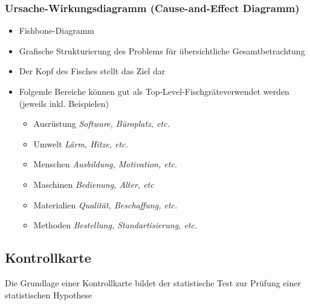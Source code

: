 \subsubsection{Ursache-Wirkungsdiagramm (Cause-and-Effect Diagramm)}
\label{subsubsec:UrsacheWirkungsDiagramm}
\begin{itemize}
	\item \glqq Fishbone-Diagramm\grqq 
	\item Grafische Strukturierung des Problems für übersichtliche Gesamtbetrachtung
	\item Der Kopf des Fisches stellt das Ziel dar
	\item Folgende Bereiche können gut als \glqq Top-Level-Fischgräte\grqq verwendet werden (jeweils inkl. Beispielen)
	\begin{itemize}
		\item Ausrüstung \textit{Software, Büroplatz, etc.}
		\item Umwelt \textit{Lärm, Hitze, etc.}
		\item Menschen \textit{Ausbildung, Motivation, etc.}
		\item Maschinen \textit{Bedienung, Alter, etc}
		\item Materialien \textit{Qualität, Beschaffung, etc.}
		\item Methoden \textit{Bestellung, Standartisierung, etc.}
	\end{itemize}
\end{itemize}

\subsection{Kontrollkarte}
\label{subsec:Kontrollkarte}
Die Grundlage einer Kontrollkarte bildet der statistische Test zur Prüfung einer statistischen Hypothese
